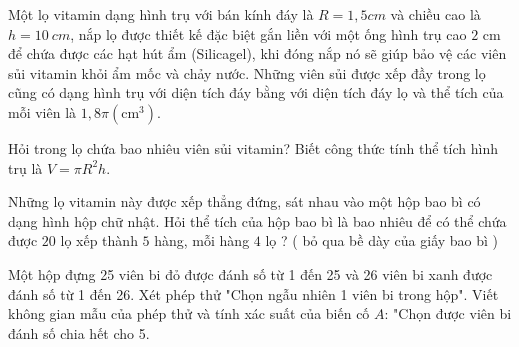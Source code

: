 \begin{bt}[1 điểm]%
Một lọ vitamin dạng hình trụ với bán kính đáy là ${R}=1,5 {cm}$ và chiều cao là ${h}=10 {~cm}$, nắp lọ được thiết kế đặc biệt gắn liền với một ống hình trụ cao $2$ cm để chứa được các hạt hút ẩm (Silicagel), khi đóng nắp nó sẽ giúp bảo vệ các viên sủi vitamin khỏi ẩm mốc và chảy nước. Những viên sủi được xếp đầy trong lọ cũng có dạng hình trụ với diện tích đáy bằng với diện tích đáy lọ và thể tích của mỗi viên là $1,8 \pi\left(\mathrm{cm}^{3}\right)$.
\begin{listEX}
\item Hỏi trong lọ chứa bao nhiêu viên sủi vitamin? Biết công thức tính thể tích hình trụ là $V=\pi R^{2} h$.
\item Những lọ vitamin này được xếp thẳng đứng, sát nhau vào một hộp bao bì có dạng hình hộp chữ nhật. Hỏi thể tích của hộp bao bì là bao nhiêu để có thể chứa được $20$ lọ xếp thành $5$ hàng, mỗi hàng $4$ lọ ? ( bỏ qua bề dày của giấy bao bì )
\end{listEX}
\end{bt}

\begin{bt}[1,0 điểm]
Một hộp đựng 25 viên bi đỏ được đánh số từ 1 đến 25 và 26 viên bi xanh được đánh số từ 1 đến 26. Xét phép thử "Chọn ngẫu nhiên 1 viên bi trong hộp". Viết không gian mẫu của phép thử và tính xác suất của biến cố $A$: "Chọn được viên bi đánh số chia hết cho 5.
\end{bt}

